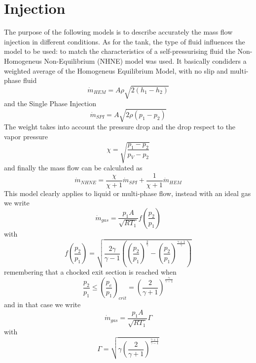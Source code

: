 \newpage
\chapter{Injection}
The purpose of the following models is to describe accurately the mass flow injection in different conditions.
As for the tank, the type of fluid influences the model to be used: to match the characteristics of a self-pressurising fluid
the Non-Homogeneus Non-Equilibrium (NHNE) model \cite{MassFlowRate2013} was used.
It basically condiders a weighted average of the Homogeneus Equilibrium Model,
with no slip and multi-phase fluid
\begin{equation}
	\dot{m}_{HEM}=A\rho \sqrt{2(h_1-h_2)}
\end{equation}
and the Single Phase Injection
\begin{equation}
	\dot{m}_{SPI}=A \sqrt{2\rho (p_1-p_2)}
\end{equation}
The weight takes into account the pressure drop and the drop respect to the vapor pressure
\begin{equation}
	\chi=\sqrt{\frac{p_1-p_2}{p_V-p_2}}
\end{equation}
and finally the mass flow can be calculated as
\begin{equation}
	\dot{m}_{NHNE}=\frac{\chi}{\chi+1}\dot{m}_{SPI}+\frac{1}{\chi+1}\dot{m}_{HEM}
\end{equation}
This model clearly applies to liquid or multi-phase flow, instead with an ideal gas we write
\begin{equation}
	\dot{m}_{gas}= \frac{p_1A}{\sqrt{RT_1}}f(\frac{p_2}{p_1})
\end{equation}
with
\begin{equation*}
	f(\frac{p_2}{p_1})=\sqrt{\frac{2\gamma}{\gamma -1}((\frac{p_2}{p_1})^\frac{2}{\gamma}-(\frac{p_2}{p_1})^\frac{\gamma +1}{\gamma})}
\end{equation*}
remembering that a chocked exit section is reached when
\begin{equation}
	\frac{p_2}{p_1} \leq (\frac{p_e}{p_1})_{crit}=(\frac{2}{\gamma +1})^\frac{\gamma}{\gamma -1}
\end{equation}
and in that case we write
\begin{equation}
	\dot{m}_{gas}= \frac{p_1A}{\sqrt{RT_1}}\Gamma
\end{equation}
with
\begin{equation*}
	\Gamma=\sqrt{\gamma (\frac{2}{\gamma +1})^\frac{\gamma +1}{\gamma -1}}
\end{equation*}
